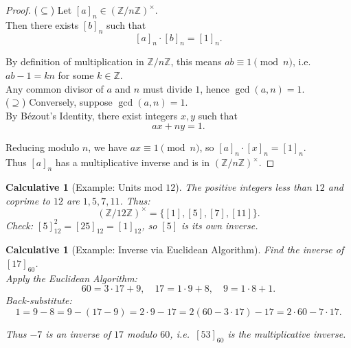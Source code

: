 \documentclass[12pt]{article}
\newtheorem{calculative}[theorem]{Calculative}
\theoremstyle{definition}
\begin{document}
\begin{proof}
($\subseteq$) Let $[a]_n\in (\mathbb{Z}/n\mathbb{Z})^\times$.\\ 

\noindent
Then there exists $[b]_n$ such that
\[
[a]_n\cdot[b]_n = [1]_n.
\]

\noindent
By definition of multiplication in $\mathbb{Z}/n\mathbb{Z}$, this means $ab \equiv 1 \pmod n$, i.e. $ab-1 = kn$ for some $k\in\mathbb{Z}$.\\ 

\noindent
Any common divisor of $a$ and $n$ must divide $1$, hence $\gcd(a,n)=1$.\\

\noindent
($\supseteq$) Conversely, suppose $\gcd(a,n)=1$. \\

\noindent
By B\'ezout’s Identity, there exist integers $x,y$ such that
\[
ax + ny = 1.
\]

\noindent
Reducing modulo $n$, we have $ax \equiv 1 \pmod n$, so $[a]_n\cdot[x]_n = [1]_n$. \\

\noindent
Thus $[a]_n$ has a multiplicative inverse and is in $(\mathbb{Z}/n\mathbb{Z})^\times$.
\end{proof}

\dotfill

\begin{calculative}[Example: Units mod $12$]
The positive integers less than $12$ and coprime to $12$ are $1,5,7,11$. Thus:
\[
(\mathbb{Z}/12\mathbb{Z})^\times = \{[1],[5],[7],[11]\}.
\]
Check: $[5]_{12}^2=[25]_{12}=[1]_{12}$, so $[5]$ is its own inverse.
\end{calculative}

\dotfill

\begin{calculative}[Example: Inverse via Euclidean Algorithm]

\noindent
Find the inverse of $[17]_{60}$. \\

\noindent
Apply the Euclidean Algorithm:
\[
60=3\cdot 17 + 9,\quad
17 = 1\cdot 9 + 8,\quad
9 = 1\cdot 8 + 1.
\]
Back-substitute:
\[
1 = 9 - 8
= 9 - (17 - 9)
= 2\cdot 9 - 17
= 2(60 - 3\cdot 17) - 17
= 2\cdot 60 - 7\cdot 17.
\]

\noindent
Thus $-7$ is an inverse of $17$ modulo $60$, i.e.\ $[53]_{60}$ is the multiplicative inverse.
\end{calculative}
\end{document}
